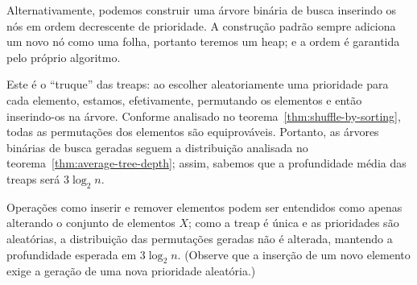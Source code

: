 Alternativamente,
podemos construir uma árvore binária de busca
inserindo os nós em ordem decrescente de prioridade.
A construção padrão sempre adiciona um novo nó como uma folha,
portanto teremos um heap;
e a ordem é garantida pelo próprio algoritmo.

Este é o ``truque'' das treaps:
ao escolher aleatoriamente uma prioridade para cada elemento,
estamos, efetivamente,
permutando os elementos e então inserindo-os na árvore.
Conforme analisado no teorema~\ref{thm:shuffle-by-sorting},
todas as permutações dos elementos são equiprováveis.
Portanto,
as árvores binárias de busca geradas
seguem a distribuição analisada no teorema~\ref{thm:average-tree-depth};
assim,
sabemos que a profundidade média das treaps será $3 \log_2 n$.

Operações como inserir e remover elementos
podem ser entendidos como apenas alterando o conjunto de elementos $X$;
como a treap é única e as prioridades são aleatórias,
a distribuição das permutações geradas não é alterada,
mantendo a profundidade esperada em $3 \log_2 n$.
(Observe que a inserção de um novo elemento
exige a geração de uma nova prioridade aleatória.)
